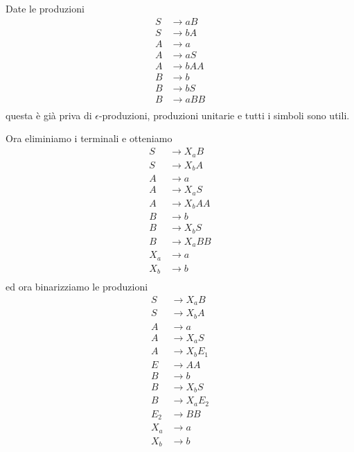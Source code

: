 \documentclass[12pt]{report}
\begin{document}
\begin{tcolorbox}[breakable]
	Date le produzioni
	\begin{align*}
		S &\rightarrow a B \\
		S &\rightarrow b A \\
		A &\rightarrow a \\
		A &\rightarrow a S \\
		A &\rightarrow b A A \\
		B &\rightarrow b \\
		B &\rightarrow b S \\
		B &\rightarrow a B B \\
	\end{align*}
	questa è già priva di $\epsilon$-produzioni, produzioni unitarie e tutti i simboli sono utili.

	Ora eliminiamo i terminali e otteniamo
	\begin{align*}
		S &\rightarrow X_a B \\
		S &\rightarrow X_b A \\
		A &\rightarrow a \\
		A &\rightarrow X_a S \\
		A &\rightarrow X_b A A \\
		B &\rightarrow b \\
		B &\rightarrow X_b S \\
		B &\rightarrow X_a B B \\
		X_a &\rightarrow a \\
		X_b &\rightarrow b \\
	\end{align*}
	ed ora binarizziamo le produzioni
	\begin{align*}
		S &\rightarrow X_a B \\
		S &\rightarrow X_b A \\
		A &\rightarrow a \\
		A &\rightarrow X_a S \\
		A &\rightarrow X_b E_1 \\
		E &\rightarrow A A \\
		B &\rightarrow b \\
		B &\rightarrow X_b S \\
		B &\rightarrow X_a E_2 \\
		E_2 &\rightarrow B B \\
		X_a &\rightarrow a \\
		X_b &\rightarrow b \\
	\end{align*}
\end{tcolorbox}
\end{document}
